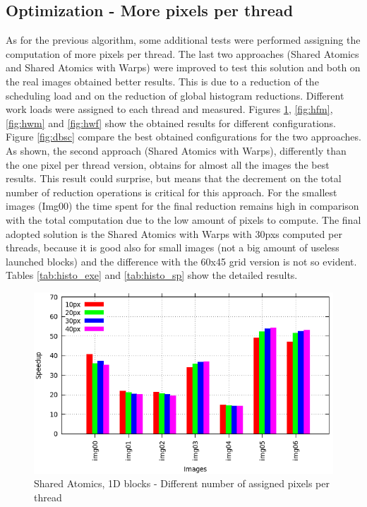 \documentclass[a4paper]{article}
\begin{document}
\subsection{Optimization - More pixels per thread}
\label{sec:hop}
As for the previous algorithm, some additional tests were performed assigning the computation of more pixels per thread. The last two approaches (Shared Atomics and Shared Atomics with Warps) were improved to test this solution and both on the real images obtained better results. This is due to a reduction of the scheduling load and on the reduction of global histogram reductions. Different work loads were assigned to each thread and measured. Figures \ref{fig:hum}, \ref{fig:hfm}, \ref{fig:hwm} and \ref{fig:hwf} show the obtained results for different configurations. Figure \ref{fig:dbsc} compare the best obtained configurations for the two approaches. As shown, the second approach (Shared Atomics with Warps), differently than the one pixel per thread version, obtains for almost all the images the best results. This result could surprise, but means that the decrement on the total number of reduction operations is critical for this approach. For the smallest images (Img00) the time spent for the final reduction remains high in comparison with the total computation due to the low amount of pixels to compute. The final adopted solution is the Shared Atomics with Warps with 30pxs computed per threads, because it is good also for small images (not a big amount of useless launched blocks) and the difference with the 60x45 grid version is not so evident. Tables \ref{tab:histo_exe} and \ref{tab:histo_sp} show the detailed results.


\begin{figure}[!ht]
    \centering
    \includegraphics[width=0.65\linewidth]{res/new/histogram_uni_more}
    \caption{Shared Atomics, 1D blocks - Different number of assigned pixels per thread}
    \label{fig:hum}
\end{figure}
\FloatBarrier
\end{document}
